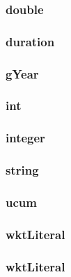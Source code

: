\documentclass{article}
\begin{document}
\subsubsection*{double}

\subsubsection*{duration}

\subsubsection*{gYear}

\subsubsection*{int}

\subsubsection*{integer}

\subsubsection*{string}

\subsubsection*{ucum}

\subsubsection*{wktLiteral}

\subsubsection*{wktLiteral}
\end{document}
